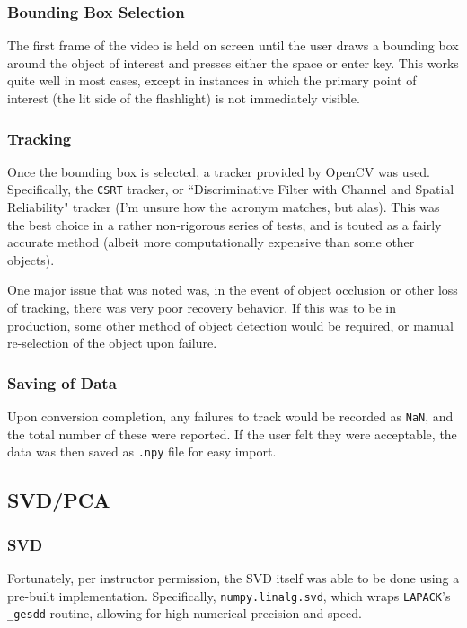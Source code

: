 \documentclass[journal]{IEEEtran}
\def\code#1{\texttt{#1}}
\begin{document}
\subsubsection{Bounding Box Selection}
The first frame of the video is held on screen until the user draws a bounding box around the object of interest and presses either the space or enter key. This works quite well in most cases, except in instances in which the primary point of interest (the lit side of the flashlight) is not immediately visible.

\subsubsection{Tracking}
Once the bounding box is selected, a tracker provided by OpenCV was used. Specifically, the \code{CSRT} tracker, or ``Discriminative Filter with Channel and Spatial Reliability" tracker (I'm unsure how the acronym matches, but alas). This was the best choice in a rather non-rigorous series of tests, and is touted as a fairly accurate method (albeit more computationally expensive than some other objects).

One major issue that was noted was, in the event of object occlusion or other loss of tracking, there was very poor recovery behavior. If this was to be in production, some other method of object detection would be required, or manual re-selection of the object upon failure.

\subsubsection{Saving of Data}
Upon conversion completion, any failures to track would be recorded as \code{NaN}, and the total number of these were reported. If the user felt they were acceptable, the data was then saved as \code{.npy} file for easy import.

\subsection{SVD/PCA}

\subsubsection{SVD}
Fortunately, per instructor permission, the SVD itself was able to be done using a pre-built implementation. Specifically, \code{numpy.linalg.svd}, which wraps \code{LAPACK}'s \code{\_gesdd} routine, allowing for high numerical precision and speed.
\end{document}
